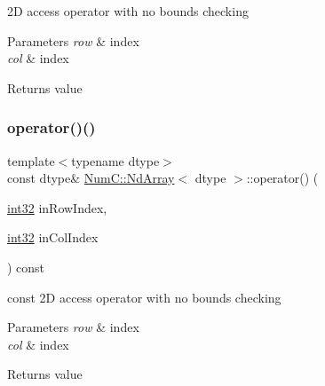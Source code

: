 2D access operator with no bounds checking


\begin{DoxyParams}{Parameters}
{\em row} & index \\
\hline
{\em col} & index \\
\hline
\end{DoxyParams}
\begin{DoxyReturn}{Returns}
value 
\end{DoxyReturn}
\mbox{\label{class_num_c_1_1_nd_array_a1e7b94b3396715c3d6a3befc24b907e3}} 
\subsubsection{\texorpdfstring{operator()()}{operator()()}\hspace{0.1cm}{\footnotesize\ttfamily [2/5]}}
{\footnotesize\ttfamily template$<$typename dtype$>$ \\
const dtype\& \mbox{\hyperlink{class_num_c_1_1_nd_array}{Num\+C\+::\+Nd\+Array}}$<$ dtype $>$\+::operator() (\begin{DoxyParamCaption}\item[{\mbox{\hyperlink{namespace_num_c_aa5a7e69266097d55816d4cdb19542b53}{int32}}}]{in\+Row\+Index,  }\item[{\mbox{\hyperlink{namespace_num_c_aa5a7e69266097d55816d4cdb19542b53}{int32}}}]{in\+Col\+Index }\end{DoxyParamCaption}) const\hspace{0.3cm}{\ttfamily [inline]}}

const 2D access operator with no bounds checking


\begin{DoxyParams}{Parameters}
{\em row} & index \\
\hline
{\em col} & index \\
\hline
\end{DoxyParams}
\begin{DoxyReturn}{Returns}
value 
\end{DoxyReturn}
\mbox{\label{class_num_c_1_1_nd_array_a1aba19daad3acef73ee1538ea75c67cd}} 

